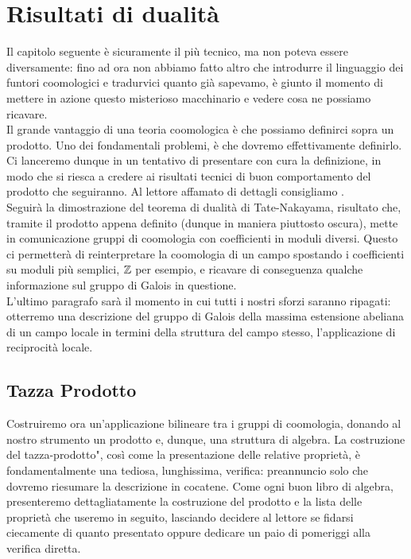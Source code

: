\chapter{Risultati di dualità}
Il capitolo seguente è sicuramente il più tecnico, ma non poteva essere diversamente: fino ad ora non abbiamo fatto altro che introdurre il linguaggio dei funtori coomologici e tradurvici quanto già sapevamo, è giunto il momento di mettere in azione questo misterioso macchinario e vedere cosa ne possiamo ricavare.\\

Il grande vantaggio di una teoria coomologica è che possiamo definirci sopra un prodotto. Uno dei fondamentali problemi, è che dovremo effettivamente definirlo. Ci lanceremo dunque in un tentativo di presentare con cura la definizione, in modo che si riesca a credere ai risultati tecnici di buon comportamento del prodotto che seguiranno. Al lettore affamato di dettagli consigliamo \cite{Schmidt}. \\

Seguirà la dimostrazione del teorema di dualità di Tate-Nakayama, risultato che, tramite il prodotto appena definito (dunque in maniera piuttosto oscura), mette in comunicazione gruppi di coomologia con coefficienti in moduli diversi. Questo ci permetterà di reinterpretare la coomologia di un campo spostando i coefficienti su moduli più semplici, $ \mathbb{Z} $ per esempio, e ricavare di conseguenza qualche informazione sul gruppo di Galois in questione. \\

L'ultimo paragrafo sarà il momento in cui tutti i nostri sforzi saranno ripagati: otterremo una descrizione del gruppo di Galois della massima estensione abeliana di un campo locale in termini della struttura del campo stesso, l'applicazione di reciprocità locale.

\section{Tazza Prodotto}
Costruiremo ora un'applicazione bilineare tra i gruppi di coomologia, donando al nostro strumento un prodotto e, dunque, una struttura di algebra. La costruzione del \leftquote tazza-prodotto", così come la presentazione delle relative proprietà, è fondamentalmente una tediosa, lunghissima, verifica: preannuncio solo che dovremo riesumare la descrizione in cocatene. Come ogni buon libro di algebra, presenteremo dettagliatamente la costruzione del prodotto e la lista delle proprietà che useremo in seguito, lasciando decidere al lettore se fidarsi ciecamente di quanto presentato oppure dedicare un paio di pomeriggi alla verifica diretta. \\

